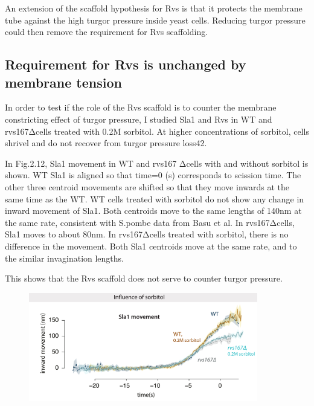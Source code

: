 An extension of the scaffold hypothesis for Rvs is that it protects the membrane tube against the high turgor pressure inside yeast cells. Reducing turgor pressure could then remove the requirement for Rvs scaffolding.

	\subsection{Requirement for Rvs is unchanged by membrane tension}
	In order to test if the role of the Rvs scaffold is to counter the membrane constricting effect of turgor pressure, I studied Sla1 and Rvs in WT and rvs167Δcells treated with 0.2M sorbitol. At higher concentrations of sorbitol, cells shrivel and do not recover from turgor pressure loss42.

In Fig.2.12, Sla1 movement in WT and rvs167 Δcells with and without sorbitol is shown. WT Sla1 is aligned so that time=0 (s) corresponds to scission time. The other three centroid movements are shifted so that they move inwards at the same time as the WT. WT cells treated with sorbitol do not show any change in inward movement of Sla1. Both centroids move to the same lengths of 140nm at the same rate, consistent with S.pombe data from Basu et al. In rvs167Δcells, Sla1 moves to about 80nm. In rvs167Δcells treated with sorbitol, there is no difference in the movement. Both Sla1 centroids move at the same rate, and to the similar invagination lengths.

This shows that the Rvs scaffold does not serve to counter turgor pressure.  

	\begin{figure}[H]
	\centering
	\includegraphics[width=10cm,height=10 cm,keepaspectratio]{figures/results_final/sorbitol2}
	\end{figure}

